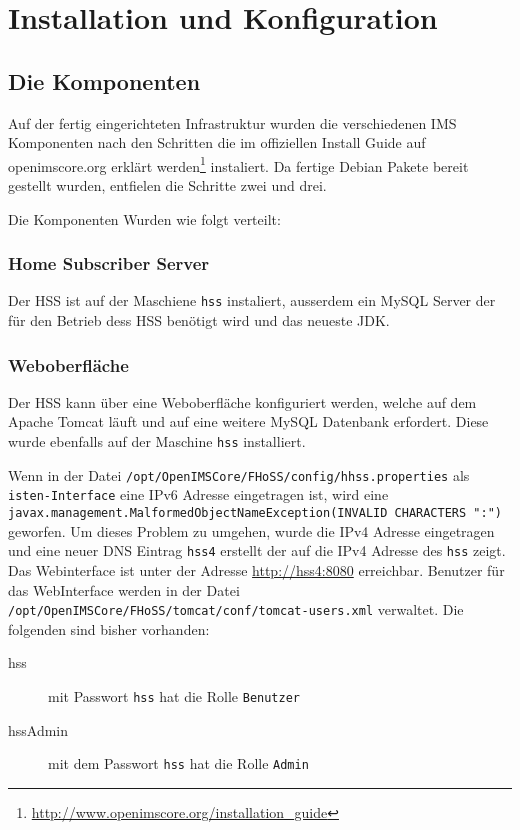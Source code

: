 \section{Installation und Konfiguration}
\label{sec:openims_config}

\subsection{Die Komponenten}
Auf der fertig eingerichteten Infrastruktur wurden die verschiedenen IMS Komponenten nach den Schritten die im offiziellen Install Guide auf openimscore.org erklärt werden\footnote{\url{http://www.openimscore.org/installation_guide}} instaliert.
Da fertige Debian Pakete bereit gestellt wurden, entfielen die Schritte zwei und drei.

Die Komponenten Wurden wie folgt verteilt:

\subsubsection{Home Subscriber Server}
Der HSS ist auf der Maschiene \lstinline{hss} instaliert, ausserdem ein MySQL Server der für den Betrieb dess HSS benötigt wird und das neueste JDK.

\subsubsection{Weboberfläche}

Der HSS kann über eine Weboberfläche konfiguriert werden, welche auf dem Apache Tomcat läuft und auf eine weitere MySQL Datenbank erfordert.
Diese wurde ebenfalls auf der Maschine \lstinline{hss} installiert.

Wenn in der Datei  \lstinline{/opt/OpenIMSCore/FHoSS/config/hhss.properties} als \lstinline{isten-Interface} eine IPv6 Adresse eingetragen ist, wird eine \lstinline{javax.management.MalformedObjectNameException(INVALID CHARACTERS ":")} geworfen. Um dieses Problem zu umgehen, wurde die IPv4 Adresse eingetragen und eine neuer DNS Eintrag \lstinline{hss4} erstellt der auf die IPv4 Adresse des \lstinline{hss} zeigt.
Das Webinterface ist unter der Adresse \url{http://hss4:8080} erreichbar. 
Benutzer für das WebInterface werden in der Datei \lstinline{/opt/OpenIMSCore/FHoSS/tomcat/conf/tomcat-users.xml} verwaltet. Die folgenden sind bisher vorhanden:
\begin{description}
\item [hss] mit Passwort \lstinline{hss} hat die Rolle \lstinline{Benutzer}
\item [hssAdmin] mit dem Passwort \lstinline{hss} hat die Rolle \lstinline{Admin}
\end{description}

